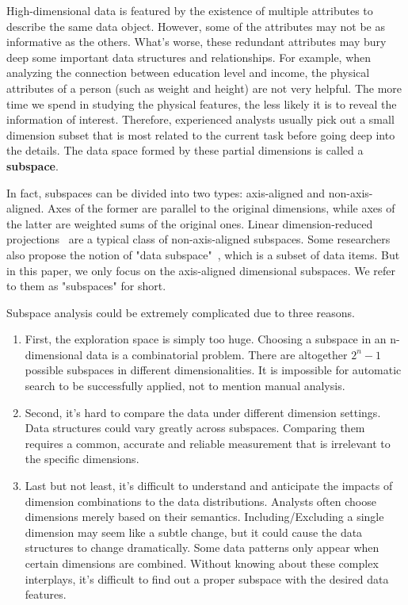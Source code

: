 \maketitle

High-dimensional data is featured by the existence of multiple attributes to describe the same data object. However, some of the attributes may not be as informative as the others. What's worse, these redundant attributes may bury deep some important data structures and relationships. For example, when analyzing the connection between education level and income, the physical attributes of a person (such as weight and height) are not very helpful. The more time we spend in studying the physical features, the less likely it is to reveal the information of interest. Therefore, experienced analysts usually pick out a small dimension subset that is most related to the current task before going deep into the details. The data space formed by these partial dimensions is called a \textbf{subspace}.

In fact, subspaces can be divided into two types: axis-aligned and non-axis-aligned. Axes of the former are parallel to the original dimensions, while axes of the latter are weighted sums of the original ones. Linear dimension-reduced projections~\cite{fodor2002survey} are a typical class of non-axis-aligned subspaces. Some researchers also propose the notion of "data subspace"~\cite{DBLP:journals/tvcg/YuanRWG13}, which is a subset of data items. But in this paper, we only focus on the axis-aligned dimensional subspaces. We refer to them as "subspaces" for short.

Subspace analysis could be extremely complicated due to three reasons. 
\begin{enumerate} [1).]
\item First, the exploration space is simply too huge. Choosing a subspace in an n-dimensional data is a combinatorial problem. There are altogether $2^{n}-1$ possible subspaces in different dimensionalities. It is impossible for automatic search to be successfully applied, not to mention manual analysis.
\item Second, it's hard to compare the data under different dimension settings. Data structures could vary greatly across subspaces. Comparing them requires a common, accurate and reliable measurement that is irrelevant to the specific dimensions.
\item Last but not least, it's difficult to understand and anticipate the impacts of dimension combinations to the data distributions. Analysts often choose dimensions merely based on their semantics. Including/Excluding a single dimension may seem like a subtle change, but it could cause the data structures to change dramatically. Some data patterns only appear when certain dimensions are combined. Without knowing about these complex interplays, it's difficult to find out a proper subspace with the desired data features.
\end{enumerate}

